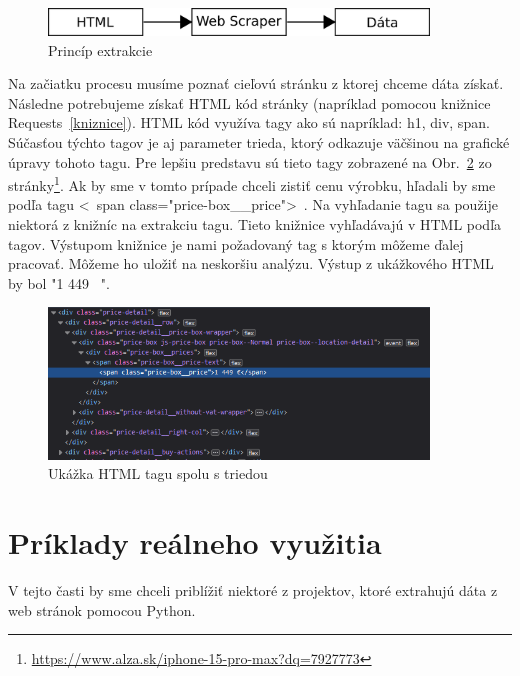 \documentclass[10pt,twoside,slovak,a4paper]{article}
\begin{document}
\begin{figure}[tbh]
    \centering
    \includegraphics[width= 0.9\textwidth]{diag.png}
    \caption{Princíp extrakcie}
    \label{f:diagram}
\end{figure}

Na začiatku procesu musíme poznať cieľovú stránku z ktorej chceme dáta získať. Následne potrebujeme získať HTML kód stránky (napríklad pomocou knižnice Requests~\ref{kniznice}). HTML kód využíva tagy ako sú napríklad: h1, div, span. Súčasťou týchto tagov je aj parameter trieda, ktorý odkazuje väčšinou na grafické úpravy tohoto tagu. Pre lepšiu predstavu sú tieto tagy zobrazené na Obr.~\ref{f:html} zo stránky\footnote{\url{https://www.alza.sk/iphone-15-pro-max?dq=7927773}}. Ak by sme v tomto prípade chceli zistiť cenu výrobku, hľadali by sme podľa tagu \textless~span class="price-box\_\_price"\textgreater~. Na vyhľadanie tagu sa použije niektorá z knižníc na extrakciu tagu. Tieto knižnice vyhľadávajú v HTML podľa tagov\cite{9215357}. Výstupom knižnice je nami požadovaný tag s ktorým môžeme ďalej pracovať. Môžeme ho uložiť na neskoršiu analýzu. Výstup z ukážkového HTML by bol "1 449 \EURdig~".

\begin{figure}[tbh]
    \centering
    \includegraphics[width= 0.9\textwidth]{html.png}
    \caption{Ukážka HTML tagu spolu s triedou}
    \label{f:html}
\end{figure}



\section{Príklady reálneho využitia}\label{usecase}
V tejto časti by sme chceli priblížiť niektoré z projektov, ktoré extrahujú dáta z web stránok pomocou Python.
\end{document}
